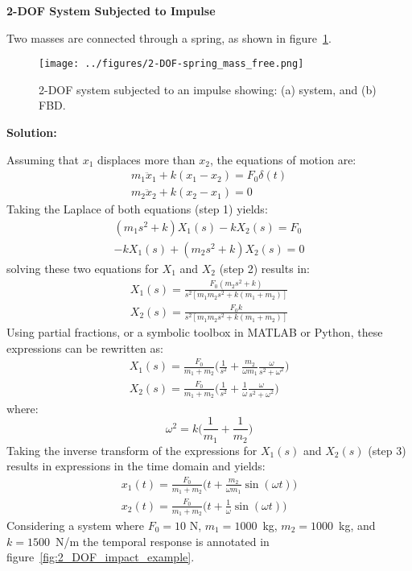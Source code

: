 \documentclass[12pt,letter]{article}
\begin{document}
	
	\begin{example}
	\textbf{2-DOF System Subjected to Impulse}
	
	\noindent Two masses are connected through a spring, as shown in figure~\ref{fig:2-DOF-spring_mass_free}. 
	\begin{figure}[H]
		\centering
		\texttt{[image: ../figures/2-DOF-spring\_mass\_free.png]}
		\caption{2-DOF system subjected to an impulse showing: (a) system, and (b) FBD.}
		\label{fig:2-DOF-spring_mass_free}
	\end{figure}

\noindent \textbf{Solution:}

	\noindent Assuming that $x_1$ displaces more than $x_2$, the equations of motion are:
	\begin{eqnarray}
	m_1\ddot{x}_1 + k(x_1-x_2)  = F_0 \delta (t) \\
	m_2\ddot{x}_2 + k(x_2-x_1)  = 0  \nonumber
	\end{eqnarray}
	Taking the Laplace of both equations (step 1) yields:
	\begin{eqnarray}
	(m_1 s^2 +k)X_1(s) - k X_2(s) = F_0 \\
	-k X_1(s) + (m_2 s^2 + k) X_2(s) = 0  \nonumber
	\end{eqnarray}
	solving these two equations for $X_1$ and $X_2$ (step 2) results in:
	\begin{eqnarray}
	X_1(s) = \frac{F_0(m_2 s^2 +k)}{s^2 [m_1 m_2 s^2 + k (m_1 + m_2)]} \\
	X_2(s) = \frac{F_0 k}{s^2 [m_1 m_2 s^2 + k (m_1 + m_2)]} \nonumber
	\end{eqnarray}
	Using partial fractions, or a symbolic toolbox in MATLAB or Python, these expressions can be rewritten as:
	\begin{eqnarray}
	X_1(s) = \frac{F_0}{m_1 + m_2} \bigg( \frac{1}{s^2} + \frac{m_2}{\omega m_1} \frac{\omega}{s^2 + \omega^2} \bigg) \\
	X_2(s) = \frac{F_0}{m_1 + m_2} \bigg( \frac{1}{s^2} + \frac{1}{\omega} \frac{\omega}{s^2 + \omega^2} \bigg) \nonumber
	\end{eqnarray}
	where:
	\begin{equation}
	\omega^2 = k \bigg( \frac{1}{m_1} + \frac{1}{m_2} \bigg)
	\end{equation}
	Taking the inverse transform of the expressions for $X_1(s)$ and $X_2(s)$ (step 3) results in expressions in the time domain and yields:
	\begin{eqnarray}
	x_1(t) = \frac{F_0}{m_1 + m_2} \bigg( t + \frac{m_2}{\omega m_1} \sin (\omega t) \bigg) \\
	x_2(t) = \frac{F_0}{m_1 + m_2} \bigg( t + \frac{1}{\omega} \sin (\omega t) \bigg) \nonumber
	\end{eqnarray}
	Considering a system where $F_0=10$ N, $m_1=1000$~kg, $m_2=1000$~kg, and $k=1500$~N/m the temporal response is annotated in figure~\ref{fig:2_DOF_impact_example}. 
	

\end{example}
\end{document}
